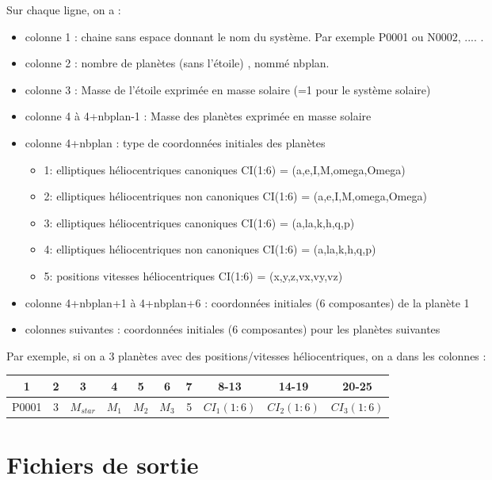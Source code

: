 \documentclass[11pt]{article}
\begin{document}
Sur chaque ligne, on a :
\begin{itemize}
\item colonne 1 : chaine sans espace donnant le nom du syst\`eme. Par exemple P0001 ou N0002, .... .
\item colonne 2 : nombre de plan\`etes (sans l'\'etoile) , nomm\'e nbplan.
\item colonne 3 : Masse de  l'\'etoile exprimée en masse solaire (=1 pour le système solaire)
\item colonne 4 \`a 4+nbplan-1 : Masse des plan\`etes exprimée en masse solaire 
\item colonne 4+nbplan : type de coordonn\'ees initiales des plan\`etes
\begin{itemize}
\item 1:  elliptiques h\'eliocentriques canoniques
	     CI(1:6) = (a,e,I,M,omega,Omega)
\item 2:  elliptiques h\'eliocentriques non canoniques
	     CI(1:6) = (a,e,I,M,omega,Omega)
\item 3:  elliptiques h\'eliocentriques canoniques
	     CI(1:6) = (a,la,k,h,q,p)
\item 4:  elliptiques h\'eliocentriques non canoniques
	     CI(1:6) = (a,la,k,h,q,p)
\item 5:  positions vitesses h\'eliocentriques
	     CI(1:6) = (x,y,z,vx,vy,vz)
\end{itemize}

\item colonne 4+nbplan+1 \`a  4+nbplan+6 :   coordonn\'ees initiales (6 composantes) de la plan\`ete 1
\item  colonnes suivantes :   coordonn\'ees initiales (6 composantes) pour les plan\`etes suivantes
\end{itemize}

 Par exemple, si on a 3 plan\`etes avec des positions/vitesses h\'eliocentriques, on a dans les colonnes :
 
\begin{tabular}{|c|c|c|c|c|c|c|c|c|c|} \hline
1 &  2 &  3 & 4 & 5 &6 &7 &8-13 &14-19 &20-25 \\ \hline
P0001 & 3 & $M_{star}$  & $M_1$ &  $M_2$ & $M_3$  &5 &$CI_1(1:6)$ & $CI_2(1:6)$&$CI_3(1:6)$\\    \hline
\end{tabular}

\section{Fichiers de sortie}
\end{document}
